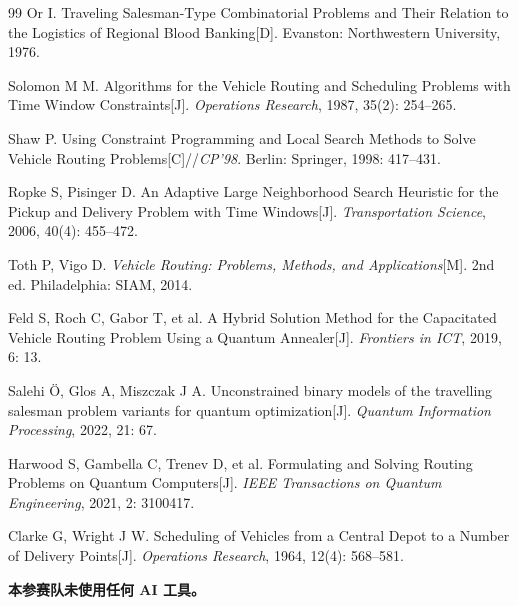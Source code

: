 \documentclass[UTF8,12pt,a4paper]{ctexart}
\begin{document}
\begin{thebibliography}{99}
 Or I. Traveling Salesman-Type Combinatorial Problems and Their Relation to the Logistics of Regional Blood Banking[D]. Evanston: Northwestern University, 1976.

 Solomon M M. Algorithms for the Vehicle Routing and Scheduling Problems with Time Window Constraints[J]. \emph{Operations Research}, 1987, 35(2): 254--265.

 Shaw P. Using Constraint Programming and Local Search Methods to Solve Vehicle Routing Problems[C]//\emph{CP'98}. Berlin: Springer, 1998: 417--431.

 Ropke S, Pisinger D. An Adaptive Large Neighborhood Search Heuristic for the Pickup and Delivery Problem with Time Windows[J]. \emph{Transportation Science}, 2006, 40(4): 455--472.

 Toth P, Vigo D. \emph{Vehicle Routing: Problems, Methods, and Applications}[M]. 2nd ed. Philadelphia: SIAM, 2014.

 Feld S, Roch C, Gabor T, et al. A Hybrid Solution Method for the Capacitated Vehicle Routing Problem Using a Quantum Annealer[J]. \emph{Frontiers in ICT}, 2019, 6: 13.

 Salehi Ö, Glos A, Miszczak J A. Unconstrained binary models of the travelling salesman problem variants for quantum optimization[J]. \emph{Quantum Information Processing}, 2022, 21: 67.

 Harwood S, Gambella C, Trenev D, et al. Formulating and Solving Routing Problems on Quantum Computers[J]. \emph{IEEE Transactions on Quantum Engineering}, 2021, 2: 3100417.

 Clarke G, Wright J W. Scheduling of Vehicles from a Central Depot to a Number of Delivery Points[J]. \emph{Operations Research}, 1964, 12(4): 568--581.

\end{thebibliography}

\vspace{0.5em}
\noindent\textbf{本参赛队未使用任何 AI 工具。}
\end{document}
